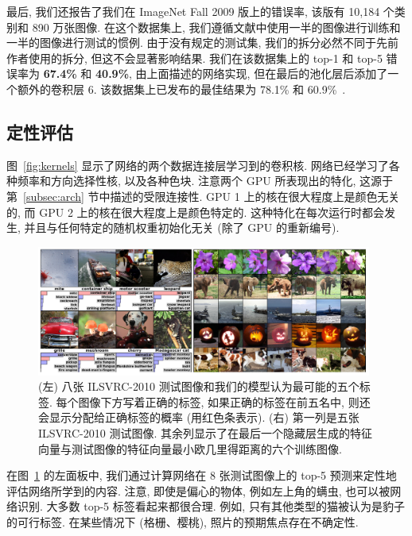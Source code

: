 \documentclass{article} %
\begin{document}
最后, 我们还报告了我们在 ImageNet Fall 2009 版上的错误率, 该版有 10,184 个类别和 890 万张图像. 在这个数据集上, 我们遵循文献中使用一半的图像进行训练和一半的图像进行测试的惯例. 由于没有规定的测试集, 我们的拆分必然不同于先前作者使用的拆分, 但这不会显著影响结果. 我们在该数据集上的 top-1 和 top-5 错误率为 \textbf{67.4\%} 和 \textbf{40.9\%}, 由上面描述的网络实现, 但在最后的池化层后添加了一个额外的卷积层 6. 该数据集上已发布的最佳结果为 78.1\% 和 60.9\%~\cite{mensink2012}.

\vspace{-1mm}
\subsection{定性评估}
\label{subsec:qualitative}
\vspace{-2ex}
图~\ref{fig:kernels} 显示了网络的两个数据连接层学习到的卷积核. 网络已经学习了各种频率和方向选择性核, 以及各种色块. 注意两个 GPU 所表现出的特化, 这源于第~\ref{subsec:arch} 节中描述的受限连接性. GPU 1 上的核在很大程度上是颜色无关的, 而 GPU 2 上的核在很大程度上是颜色特定的. 这种特化在每次运行时都会发生, 并且与任何特定的随机权重初始化无关 (除了 GPU 的重新编号).

\begin{figure}
\centering
\includegraphics[width=0.98\textwidth]{qualitative.png}

\caption{(左) 八张 ILSVRC-2010 测试图像和我们的模型认为最可能的五个标签. 每个图像下方写着正确的标签, 如果正确的标签在前五名中, 则还会显示分配给正确标签的概率 (用红色条表示). (右) 第一列是五张 ILSVRC-2010 测试图像. 其余列显示了在最后一个隐藏层生成的特征向量与测试图像的特征向量最小欧几里得距离的六个训练图像.}
\label{fig:qualitative}
\end{figure}

在图~\ref{fig:qualitative} 的左面板中, 我们通过计算网络在 8 张测试图像上的 top-5 预测来定性地评估网络所学到的内容. 注意, 即使是偏心的物体, 例如左上角的螨虫, 也可以被网络识别. 大多数 top-5 标签看起来都很合理. 例如, 只有其他类型的猫被认为是豹子的可行标签. 在某些情况下 (格栅、樱桃), 照片的预期焦点存在不确定性.
\end{document}
